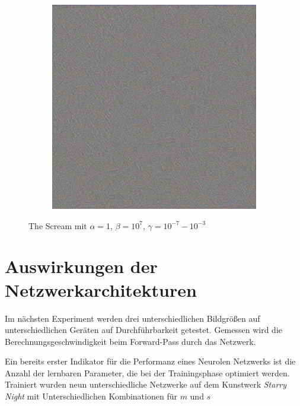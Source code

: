 \begin{figure}[H]
\begin{subfigure}[h]{0.15\textwidth}
    \end{subfigure}
    \begin{subfigure}[h]{0.15\textwidth}
        \centering
        \includegraphics[width=\textwidth]{resources/content/experiments/b__the_scream__768x768__style-weight_1e+07__tv-weight_1e-03.jpg}
    \end{subfigure}
    \caption{The Scream mit $ \alpha = 1 $, $ \beta = 10^{7} $, $ \gamma = 10^{-7} - 10^{-3} $}
\end{figure}

\pagebreak

\section{Auswirkungen der Netzwerkarchitekturen}

Im nächsten Experiment werden drei unterschiedlichen Bildgrößen auf unterschiedlichen Geräten auf Durchführbarkeit getestet.
Gemessen wird die Berechnungsgeschwindigkeit beim Forward-Pass durch das Netzwerk. 

Ein bereits erster Indikator für die Performanz eines Neurolen Netzwerks ist die Anzahl der lernbaren Parameter, die bei der Trainingsphase optimiert werden. Trainiert wurden neun unterschiedliche Netzwerke auf dem Kunstwerk \textit{Starry Night} mit Unterschiedlichen Kombinationen für $ m $ und $ s $

